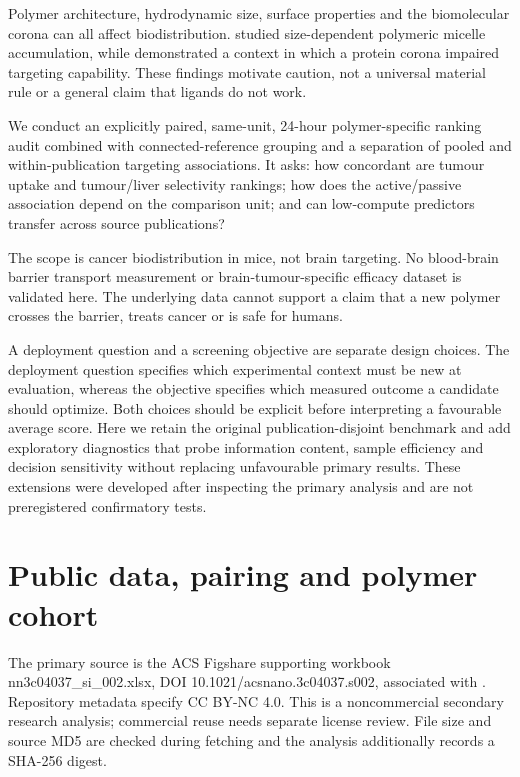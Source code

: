 \documentclass[11pt]{article}
\begin{document}
Polymer architecture, hydrodynamic size, surface properties and the biomolecular corona can all affect biodistribution. \citet{refbeea5aa0e77d} studied size-dependent polymeric micelle accumulation, while \citet{refe80b2aa9bb29} demonstrated a context in which a protein corona impaired targeting capability. These findings motivate caution, not a universal material rule or a general claim that ligands do not work.

We conduct an explicitly paired, same-unit, 24-hour polymer-specific ranking audit combined with connected-reference grouping and a separation of pooled and within-publication targeting associations. It asks: how concordant are tumour uptake and tumour/liver selectivity rankings; how does the active/passive association depend on the comparison unit; and can low-compute predictors transfer across source publications?

The scope is cancer biodistribution in mice, not brain targeting. No blood-brain barrier transport measurement or brain-tumour-specific efficacy dataset is validated here. The underlying data cannot support a claim that a new polymer crosses the barrier, treats cancer or is safe for humans.

A deployment question and a screening objective are separate design choices. The deployment question specifies which experimental context must be new at evaluation, whereas the objective specifies which measured outcome a candidate should optimize. Both choices should be explicit before interpreting a favourable average score. Here we retain the original publication-disjoint benchmark and add exploratory diagnostics that probe information content, sample efficiency and decision sensitivity without replacing unfavourable primary results. These extensions were developed after inspecting the primary analysis and are not preregistered confirmatory tests.

\section{Public data, pairing and polymer cohort}
The primary source is the ACS Figshare supporting workbook nn3c04037\_si\_002.xlsx, DOI 10.1021/acsnano.3c04037.s002, associated with \citet{ref32ce5d18e6e9}. Repository metadata specify CC BY-NC 4.0. This is a noncommercial secondary research analysis; commercial reuse needs separate license review. File size and source MD5 are checked during fetching and the analysis additionally records a SHA-256 digest.
\end{document}
